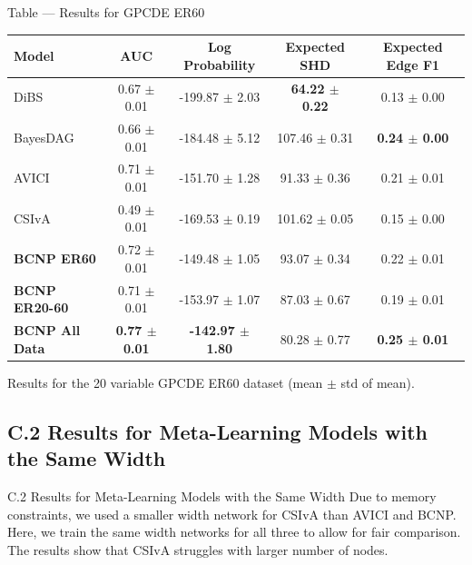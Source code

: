 \documentclass[aspectratio=169,10pt]{beamer}
\begin{document}
\begin{frame}{Table --- Results for GPCDE ER60}
\centering
\scriptsize
\begin{tabular}{lcccc}
\toprule
\textbf{Model} & \textbf{AUC} & \textbf{Log Probability} & \textbf{Expected SHD} & \textbf{Expected Edge F1} \\
\midrule
DiBS & 0.67 $\pm$ 0.01 & -199.87 $\pm$ 2.03 & \textbf{64.22 $\pm$ 0.22} & 0.13 $\pm$ 0.00 \\
BayesDAG & 0.66 $\pm$ 0.01 & -184.48 $\pm$ 5.12 & 107.46 $\pm$ 0.31 & \textbf{0.24 $\pm$ 0.00} \\
AVICI & 0.71 $\pm$ 0.01 & -151.70 $\pm$ 1.28 & 91.33 $\pm$ 0.36 & 0.21 $\pm$ 0.01 \\
CSIvA & 0.49 $\pm$ 0.01 & -169.53 $\pm$ 0.19 & 101.62 $\pm$ 0.05 & 0.15 $\pm$ 0.00 \\
\textbf{BCNP ER60} & 0.72 $\pm$ 0.01 & -149.48 $\pm$ 1.05 & 93.07 $\pm$ 0.34 & 0.22 $\pm$ 0.01 \\
\textbf{BCNP ER20-60} & 0.71 $\pm$ 0.01 & -153.97 $\pm$ 1.07 & 87.03 $\pm$ 0.67 & 0.19 $\pm$ 0.01 \\
\textbf{BCNP All Data} & \textbf{0.77 $\pm$ 0.01} & \textbf{-142.97 $\pm$ 1.80} & 80.28 $\pm$ 0.77 & \textbf{0.25 $\pm$ 0.01} \\
\bottomrule
\end{tabular}

\vspace{0.3cm}
{\footnotesize Results for the 20 variable GPCDE ER60 dataset (mean $\pm$ std of mean).}
\end{frame}

\subsection{C.2 Results for Meta-Learning Models with the Same Width}

\begin{frame}{C.2 Results for Meta-Learning Models with the Same Width}
\small
Due to memory constraints, we used a smaller width network for CSIvA than AVICI and BCNP. Here, we train the same width networks for all three to allow for fair comparison. The results show that CSIvA struggles with larger number of nodes.
\end{frame}
\end{document}
